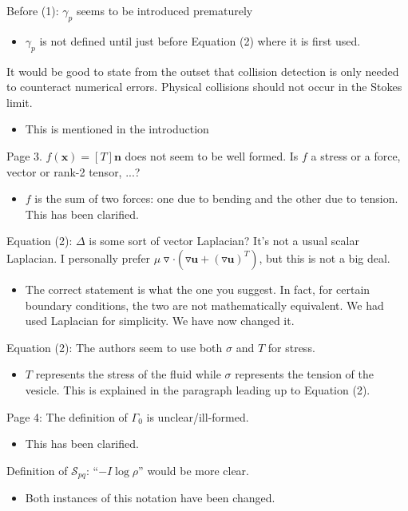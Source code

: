 \documentclass[11pt]{article}
\newcommand{\comment}[1]{{\color{blue} #1}}
\newcommand{\grad}{{\triangledown}}
\newcommand{\nn}{{\mathbf{n}}}
\newcommand{\uu}{{\mathbf{u}}}
\newcommand{\xx}{{\mathbf{x}}}
\renewcommand{\SS}{{\mathcal{S}}}
\begin{document}
\comment{Before (1): $\gamma_{p}$ seems to be introduced prematurely}
\begin{itemize}
  \item $\gamma_{p}$ is not defined until just before Equation (2)
  where it is first used.
\end{itemize}

\comment{It would be good to state from the outset that collision detection is
only needed to counteract numerical errors. Physical collisions should
not occur in the Stokes limit.}
\begin{itemize}
  \item This is mentioned in the introduction
\end{itemize}

\comment{Page 3. $f(\xx) = [T]\nn$ does not seem to be well formed. Is
$f$ a stress or a force, vector or rank-2 tensor, ...?}
\begin{itemize}
  \item $f$ is the sum of two forces: one due to bending and the other
  due to tension.  This has been clarified.
\end{itemize}


\comment{Equation (2): $\Delta$ is some sort of vector Laplacian? It’s
not a usual scalar Laplacian. I personally prefer $\mu\grad \cdot
(\grad \uu + (\grad \uu)^{T})$, but this is not a big deal.}
\begin{itemize}
  \item The correct statement is what the one you suggest. In fact, for
  certain boundary conditions, the two are not mathematically
  equivalent. We had used Laplacian for simplicity.  We have now changed
  it. 
\end{itemize}


\comment{Equation (2): The authors seem to use both $\sigma$ and $T$ for
stress.}
\begin{itemize}
  \item $T$ represents the stress of the fluid while $\sigma$
  represents the tension of the vesicle.  This is explained in the
  paragraph leading up to Equation (2).
\end{itemize}



\comment{Page 4: The definition of $\Gamma_{0}$ is unclear/ill-formed.}
\begin{itemize}
  \item This has been clarified.
\end{itemize}


\comment{Definition of $\SS_{pq}$: ``$-I \log \rho$'' would be more
clear.}
\begin{itemize}
  \item Both instances of this notation have been changed.
\end{itemize}
\end{document}
